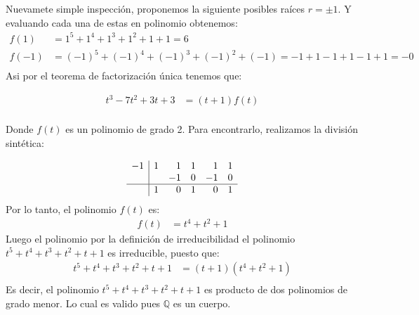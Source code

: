 \begin{solucion}
    Nuevamete simple inspección, proponemos la siguiente posibles raíces $r=\pm 1$. Y evaluando cada una de estas en polinomio obtenemos:
    \begin{align*}
    f(1) &= 1^5 + 1^4 + 1^3 + 1^2 + 1 + 1 = 6 \\
    f(-1) &= (-1)^5 + (-1)^4 + (-1)^3 + (-1)^2 + (-1) = -1 + 1 - 1 + 1 - 1 + 1 = -0 \\
    \end{align*}
    Asi por el teorema de factorización única tenemos que:

    \begin{align*}
        t^3 - 7t^2 + 3t + 3 &= (t+1)f(t) \\
    \end{align*}

    Donde $f(t)$ es un polinomio de grado 2. Para encontrarlo, realizamos la división sintética:

    \begin{align*}
        \begin{array}{r|rrrrr}
            -1 & 1 & 1 & 1 & 1 & 1 \\
              &   & -1 & 0 & -1 & 0 \\
            \hline
              & 1 & 0 & 1 & 0 & 1
        \end{array}
    \end{align*}
    Por lo tanto, el polinomio $f(t)$ es:
    \begin{align*}
        f(t) &= t^4 + t^2 + 1
    \end{align*}
    Luego el polinomio por la definición de irreducibilidad el polinomio $t^5 + t^4 + t^3 + t^2 + t + 1$ es irreducible, puesto que:
    \begin{align*}
        t^5 + t^4 + t^3 + t^2 + t + 1 &= (t+1)(t^4 + t^2 + 1) \\
    \end{align*}
    Es decir, el polinomio $t^5 + t^4 + t^3 + t^2 + t + 1$ es producto de dos polinomios de grado menor. Lo cual es valido pues $\mathbb Q$ es un cuerpo.
\end{solucion}